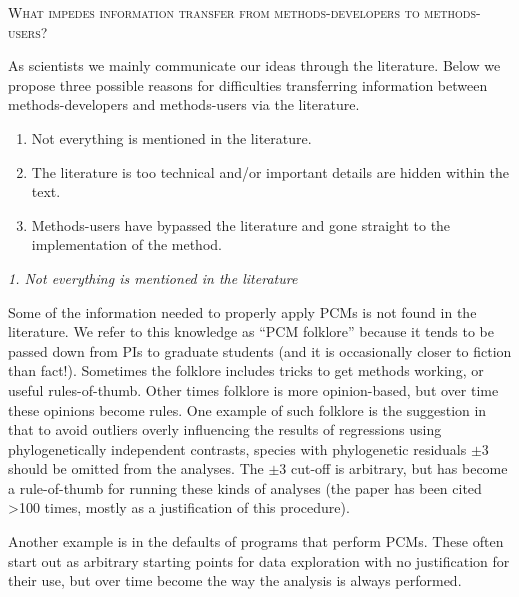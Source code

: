 \documentclass[a4paper,12pt]{article}
\renewcommand{\section}[1]{
  \bigskip
  \begin{center}
  \begin{Large}
  \normalfont\scshape #1
  \medskip
  \end{Large}
  \end{center}
}
\renewcommand{\subsection}[1]{
  \bigskip
  \begin{center}
  \begin{large}
  \normalfont\itshape #1
  \end{large}
  \end{center}
}
\begin{document}
\section{What impedes information transfer from methods-developers to methods-users?}
  As scientists we mainly communicate our ideas through the literature. 
  Below we propose three possible reasons for difficulties transferring information between methods-developers and methods-users via the literature.

    \begin{enumerate}
      \item Not everything is mentioned in the literature.
      \item The literature is too technical and/or important details are hidden within the text.
      \item Methods-users have bypassed the literature and gone straight to the implementation of the method.
    \end{enumerate}

  \subsection{1. Not everything is mentioned in the literature}
    Some of the information needed to properly apply PCMs is not found in the literature. 
    We refer to this knowledge as ``PCM folklore'' because it tends to be passed down from PIs to graduate students (and it is occasionally closer to fiction than fact!).
    Sometimes the folklore includes tricks to get methods working, or useful rules-of-thumb. 
    Other times folklore is more opinion-based, but over time these opinions become rules. 
    One example of such folklore is the suggestion in \citet{jones1997optimum} that to avoid outliers overly influencing the results of regressions using phylogenetically independent contrasts, species with phylogenetic residuals $\pm 3$ should be omitted from the analyses. %
    The $\pm 3$ cut-off is arbitrary, but has become a rule-of-thumb for running these kinds of analyses (the paper has been cited \textgreater 100 times, mostly as a justification of this procedure).
    
    Another example is in the defaults of programs that perform PCMs. 
    These often start out as arbitrary starting points for data exploration with no justification for their use, but over time become the way the analysis is always performed.
\end{document}
